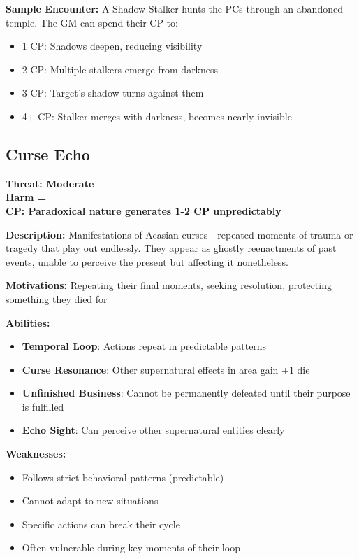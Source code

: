 \documentclass[12pt]{article}
\newcommand{\cp}[1]{\textbf{CP: #1}}
\newcommand{\harm}[1]{\textbf{Harm #1}}
\newcommand{\threat}[1]{\textbf{Threat: #1}}
\begin{document}
\textbf{Sample Encounter:}
A Shadow Stalker hunts the PCs through an abandoned temple. The GM can spend their CP to:
\begin{itemize}
\item 1 CP: Shadows deepen, reducing visibility
\item 2 CP: Multiple stalkers emerge from darkness
\item 3 CP: Target's shadow turns against them
\item 4+ CP: Stalker merges with darkness, becomes nearly invisible
\end{itemize}

\subsection*{Curse Echo}

\threat{Moderate} \\
\harm{=} \\
\cp{Paradoxical nature generates 1-2 CP unpredictably}

\vspace{0.5em}
\textbf{Description:} Manifestations of Acasian curses - repeated moments of trauma or tragedy that play out endlessly. They appear as ghostly reenactments of past events, unable to perceive the present but affecting it nonetheless.

\textbf{Motivations:} Repeating their final moments, seeking resolution, protecting something they died for

\textbf{Abilities:}
\begin{itemize}
\item \textbf{Temporal Loop}: Actions repeat in predictable patterns
\item \textbf{Curse Resonance}: Other supernatural effects in area gain +1 die
\item \textbf{Unfinished Business}: Cannot be permanently defeated until their purpose is fulfilled
\item \textbf{Echo Sight}: Can perceive other supernatural entities clearly
\end{itemize}

\textbf{Weaknesses:}
\begin{itemize}
\item Follows strict behavioral patterns (predictable)
\item Cannot adapt to new situations
\item Specific actions can break their cycle
\item Often vulnerable during key moments of their loop
\end{itemize}
\end{document}

